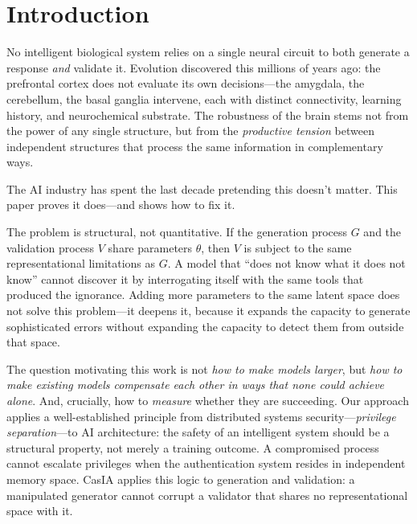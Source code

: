 \documentclass[11pt,a4paper]{article}
\theoremstyle{remark}
\begin{document}
\vspace{0.5em}

\section{Introduction}
\label{sec:intro}

No intelligent biological system relies on a single neural circuit to both generate a response \emph{and} validate it. Evolution discovered this millions of years ago: the prefrontal cortex does not evaluate its own decisions---the amygdala, the cerebellum, the basal ganglia intervene, each with distinct connectivity, learning history, and neurochemical substrate. The robustness of the brain stems not from the power of any single structure, but from the \emph{productive tension} between independent structures that process the same information in complementary ways.

The AI industry has spent the last decade pretending this doesn't matter. This paper proves it does---and shows how to fix it.

The problem is structural, not quantitative. If the generation process $G$ and the validation process $V$ share parameters $\theta$, then $V$ is subject to the same representational limitations as $G$. A model that ``does not know what it does not know'' cannot discover it by interrogating itself with the same tools that produced the ignorance. Adding more parameters to the same latent space does not solve this problem---it deepens it, because it expands the capacity to generate sophisticated errors without expanding the capacity to detect them from outside that space.

The question motivating this work is not \emph{how to make models larger}, but \emph{how to make existing models compensate each other in ways that none could achieve alone}. And, crucially, how to \emph{measure} whether they are succeeding. Our approach applies a well-established principle from distributed systems security---\emph{privilege separation}---to AI architecture: the safety of an intelligent system should be a structural property, not merely a training outcome. A compromised process cannot escalate privileges when the authentication system resides in independent memory space. CasIA applies this logic to generation and validation: a manipulated generator cannot corrupt a validator that shares no representational space with it.
\end{document}
